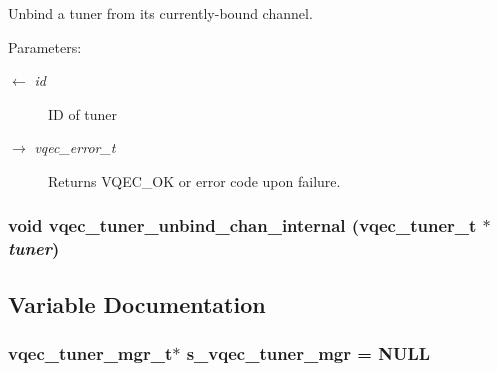 Unbind a tuner from its currently-bound channel.

\begin{Desc}
\item[Parameters:]
\begin{description}
\item[\mbox{$\leftarrow$} {\em id}]ID of tuner \item[\mbox{$\rightarrow$} {\em vqec\_\-error\_\-t}]Returns VQEC\_\-OK or error code upon failure. \end{description}
\end{Desc}
\subsubsection{\setlength{\rightskip}{0pt plus 5cm}void vqec\_\-tuner\_\-unbind\_\-chan\_\-internal (\bf{vqec\_\-tuner\_\-t} $\ast$ {\em tuner})}\label{vqec__tuner_8c_7c26860873459b51e98ba5518618f0f6}




\subsection{Variable Documentation}
\subsubsection{\setlength{\rightskip}{0pt plus 5cm}\bf{vqec\_\-tuner\_\-mgr\_\-t}$\ast$ \bf{s\_\-vqec\_\-tuner\_\-mgr} = NULL\hspace{0.3cm}{\tt  [static]}}\label{vqec__tuner_8c_ec43fbe2d5799b52f78d1bfcfe65a88b}


